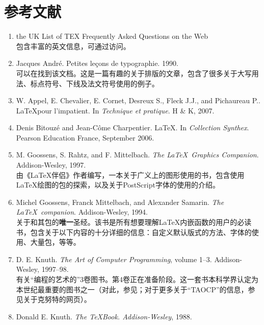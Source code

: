 \chapter{参考文献}

\begin{enumerate}
    \renewcommand{\labelenumi}{[\theenumi]}
    \item the UK List of TEX Frequently Asked Questions on the Web\\
    包含丰富的英文信息，可通过访问。
    \item Jacques André. Petites leçons de typographie. 1990.\\
    可以在找到该文档。这是一篇有趣的关于排版的文章，包含了很多关于大写用法、标点符号、下线及法文符号使用的例子。
    \item W. Appel, E. Chevalier, E. Cornet, Desreux S., Fleck J.J., and Pichaureau P.. \LaTeX pour l'impatient. In \emph{Technique et pratique}. H \& K, 2007.
    \item Denis Bitouzé and Jean-Côme Charpentier. \LaTeX . In \emph{Collection Synthex}. Pearson Education France, September 2006.
    \item M. Goossens, S. Rahtz, and F. Mittelbach. \emph{The \LaTeX \ Graphics Companion}. Addison-Wesley, 1997.\\
    由《\LaTeX 伴侣》作者编写，一本关于广义上的图形使用的书，包含使用\LaTeX 绘图的包的探索，以及关于PostScript字体的使用的介绍。
    \item Michel Goossens, Franck Mittelbach, and Alexander Samarin. \emph{The \LaTeX \ companion}. \linebreak Addison-Wesley, 1994.\\
    关于\LaTeXe 和其包的\textbf{唯一}圣经。该书是所有想要理解\LaTeX 内嵌函数的用户的必读书，包含关于以下内容的十分详细的信息：自定义默认版式的方法、字体的使用、大量包，等等。
    \item D. E. Knuth. \emph{The Art of Computer Programming}, volume 1–3. Addison-Wesley, 1997–98.\\
    有关“编程的艺术的”3卷图书。第4卷正在准备阶段。这一套书本科学界认定为本世纪最重要的图书之一（对此，参见；对于更多关于“TAOCP”的信息，参见关于克努特的网页）。
    \item Donald E. Knuth. \emph{The \TeX Book. Addison-Wesley}, 1988.\\

\end{enumerate}
